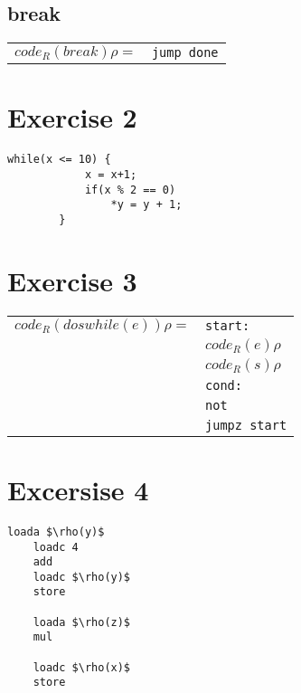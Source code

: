 \documentclass[10pt,a4paper]{article}
\begin{document}
	\subsection{break}
	
	\begin{tabular}{l l}
		$code_R(break) \rho = $ & \texttt{jump done}
	\end{tabular}
	
	\section{Exercise 2}
	
	\begin{lstlisting}[mathescape]
		while(x <= 10) {
			x = x+1;
			if(x % 2 == 0)
				*y = y + 1;
		}
	\end{lstlisting}
	
	\section{Exercise 3}
	
	\begin{tabular}{l l}
		$code_R(do s while(e)) \rho = $ & \texttt{start:} \\
		& $code_R(e) \rho$ \\
		& $code_R(s) \rho$ \\
		& \texttt{cond:} \\
		& \texttt{not} \\
		& \texttt{jumpz start}
	\end{tabular}
	
	\section{Excersise 4}
	
	
	\begin{lstlisting}[mathescape]
	loada $\rho(y)$
	loadc 4
	add
	loadc $\rho(y)$
	store
	
	loada $\rho(z)$
	mul
	
	loadc $\rho(x)$
	store
	\end{lstlisting}
\end{document}

